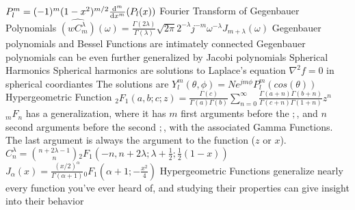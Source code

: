 \documentclass[14pt]{extarticle}
\newcommand*\pFq[2]{{}_{#1}F_{#2}}
\begin{document}
\begin{outline}
						\4	$P_l^m = (-1)^m (1-x^2)^{m/2}\od[m]{}{x}(P_l(x))$
				\2	Fourier Transform of Gegenbauer Polynomials
					\3	$\hat{(wC_m^{\lambda})}(\omega) = \frac{\Gamma(2\lambda)}{\Gamma(\lambda)}
								\sqrt{2\pi}2^{-\lambda} j^{-m}\omega^{-\lambda}J_{m+\lambda}(\omega)$
					\3	Gegenbauer polynomials and Bessel Functions are intimately connected
					\3	Gegenbauer polynomials can be even further generalized by 
							Jacobi polynomials
			\1	Spherical Harmonics
				\2	Spherical harmonics are solutions to Laplace's equation
						$\nabla^2 f = 0$ in spherical coordiantes
				\2	The solutions are $Y_l^m(\theta,\phi) = N e^{j m \phi} P_l^m(cos(\theta))$
			\1	Hypergeometric Function
				\2	$\pFq{2}{1}(a,b;c;z) = \frac{\Gamma(c)}{\Gamma(a)\Gamma(b)}
							\sum_{n=0}^{\infty} \frac{\Gamma(a + n)\Gamma(b + n)}{\Gamma(c + n)\Gamma(1+n)}
							z^n$
				\2	$\pFq{m}{n}$ has a generalization, where it has $m$ first arguments
						before the $;$, and $n$ second arguments before the second $;$, with
						the associated Gamma Functions.  The last argument is always the
						argument to the function ($z$ or $x$).
				\2	$C_n^{\lambda} = \binom{n+2\lambda - 1}{n}	
							\pFq{2}{1}(-n,n+2\lambda;\lambda + \frac{1}{2};\frac{1}{2}(1-x))$
				\2	$J_{\alpha}(x) = \frac{(x/2)^{\alpha}}{\Gamma(\alpha + 1)}
							\pFq{0}{1}(\alpha + 1; - \frac{x^2}{4})$
				\2	Hypergeometric Functions generalize nearly every function you've
						ever heard of, and studying their properties can give insight into
						their behavior

\end{outline}
\end{document}
